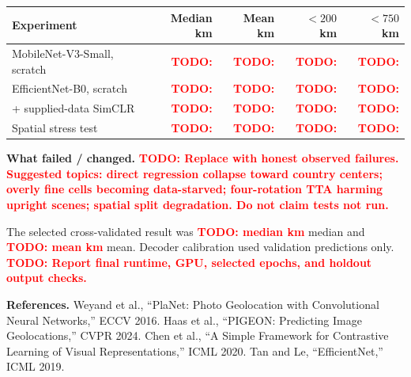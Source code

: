 \documentclass[10pt]{article}
\newcommand{\todo}[1]{\textcolor{red}{\textbf{TODO: #1}}}
\newcommand{\medkm}{\todo{median km}}
\newcommand{\meankm}{\todo{mean km}}
\begin{document}
\begin{center}
\small
\begin{tabular}{lrrrr}
\toprule
Experiment & Median km & Mean km & $<200$ km & $<750$ km \\
\midrule
MobileNet-V3-Small, scratch & \todo{} & \todo{} & \todo{} & \todo{} \\
EfficientNet-B0, scratch & \todo{} & \todo{} & \todo{} & \todo{} \\
+ supplied-data SimCLR & \todo{} & \todo{} & \todo{} & \todo{} \\
Spatial stress test & \todo{} & \todo{} & \todo{} & \todo{} \\
\bottomrule
\end{tabular}
\end{center}

\textbf{What failed / changed.}
\todo{Replace with honest observed failures. Suggested topics: direct regression collapse toward country centers; overly fine cells becoming data-starved; four-rotation TTA harming upright scenes; spatial split degradation. Do not claim tests not run.}

The selected cross-validated result was \medkm{} median and \meankm{} mean. Decoder calibration used validation predictions only. \todo{Report final runtime, GPU, selected epochs, and holdout output checks.}

\textbf{References.}
Weyand et al., ``PlaNet: Photo Geolocation with Convolutional Neural Networks,'' ECCV 2016.
Haas et al., ``PIGEON: Predicting Image Geolocations,'' CVPR 2024.
Chen et al., ``A Simple Framework for Contrastive Learning of Visual Representations,'' ICML 2020.
Tan and Le, ``EfficientNet,'' ICML 2019.
\end{document}

